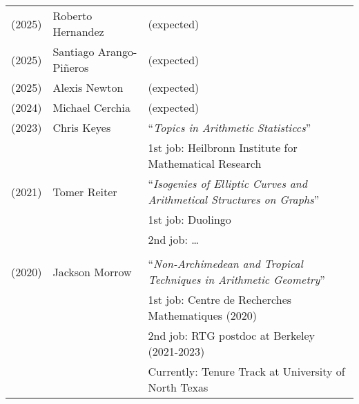 \documentclass[margin,line]{res}
\newcommand{\defi}[1]{\textsf{#1}} 				%
\begin{document}
\begin{resume}
\begin{tabular}{lll}
  (2025) & \defi{Roberto Hernandez} & (expected)
    \vspace{4pt}\\    
  (2025) & \defi{Santiago Arango-Pi\~neros} & (expected)
    \vspace{4pt}\\  
  (2025) & \defi{Alexis Newton} & (expected)
    \vspace{4pt}\\
  (2024) & \defi{Michael Cerchia} & (expected)
    \vspace{4pt}\\
  (2023) & \defi{Chris Keyes} &  ``\emph{Topics in Arithmetic Statisticcs}'' \\
         && \hspace{4 pt} 1st job: Heilbronn Institute for Mathematical Research
         \vspace{4pt}\\
  (2021) & \defi{Tomer Reiter} &  ``\emph{Isogenies of Elliptic Curves and Arithmetical Structures on Graphs}'' \\
           && \hspace{4 pt} 1st job: Duolingo\\
         && \hspace{4 pt} 2nd job: \ldots      \\         
    \vspace{4pt}\\ 
  (2020) & \defi{Jackson Morrow} &  ``\emph{Non-Archimedean and Tropical Techniques in Arithmetic Geometry}'' \\
         && \hspace{4 pt} 1st job: Centre de Recherches Mathematiques (2020)\\
         &&  \hspace{4 pt} 2nd job: RTG postdoc at Berkeley (2021-2023)\\
         && \hspace{4 pt} Currently: Tenure Track at University of North Texas\\ 

\end{tabular}
\end{resume}
\end{document}
